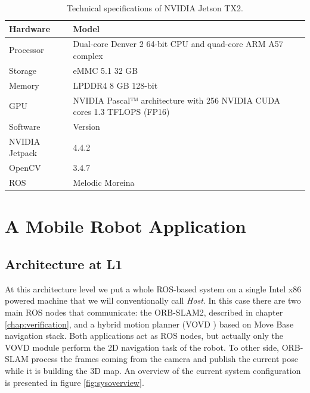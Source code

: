 \begin{table}[htbp]
	\centering
	\begin{tabularx}{\linewidth}{|l|X|}
		\hline
		\rowcolor{Gray}
		Hardware         & Model \\
		\hline
		Processor        & Dual-core Denver 2 64-bit CPU and quad-core ARM A57 complex \\
		Storage          & eMMC 5.1 32 GB \\
		Memory           & LPDDR4 8 GB 128-bit \\
		GPU              & NVIDIA Pascal™ architecture with 256 NVIDIA CUDA cores 1.3 TFLOPS (FP16) \\
		\hline
		\rowcolor{Gray}
		Software         & Version \\
		\hline
		NVIDIA Jetpack   & 4.4.2 \\
		OpenCV           & 3.4.7 \\
		ROS              & Melodic Moreina \\
		\hline
	\end{tabularx}
	\caption{Technical specifications of NVIDIA Jetson TX2. \label{tab:tech-specs-tx2}}
\end{table}


\section{A Mobile Robot Application}

\subsection{Architecture at L1}
At this architecture level we put a whole ROS-based system on a single Intel x86 powered machine that we will conventionally call \textit{Host}.
In this case there are two main ROS nodes that communicate: the ORB-SLAM2, described in chapter \ref{chap:verification}, and a hybrid motion planner (VOVD \cite{VOVD}) based on Move Base navigation stack. 
Both applications act as ROS nodes, but actually only the VOVD module perform the 2D navigation task of the robot. To other side, ORB-SLAM process the frames coming from the camera and publish the current pose while it is building the 3D map.
An overview of the current system configuration is presented in figure \ref{fig:sysoverview}.


